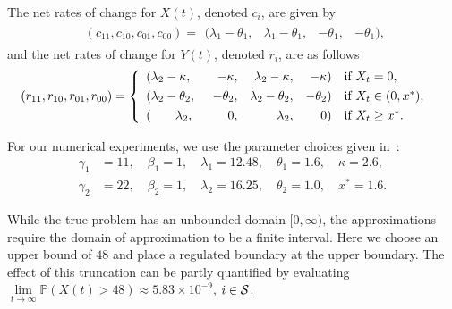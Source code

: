 \begin{model}
	The net rates of change for $X(t)$, denoted $c_i$, are given by 
	\begin{align*} 
	& (c_{11},c_{10},c_{01},c_{00})   =  \begin{array}{rrrr} 
	(\lambda_1-\theta_1,  & \lambda_1 -\theta_1, &  -\theta_1, & -\theta_1),
	\end{array}  
	\end{align*} 
	and the net rates of change for $Y(t)$, denoted $r_i$, are as follows  
	\begin{align*} 
	(r_{11},r_{10},r_{01},r_{00})  & = \left\{ \begin{array}{lrrrll}  
												(\lambda_2 - \kappa, & \;\;\;-\kappa,  & \lambda_2 - \kappa, & -\kappa) &\text{if } X_t = 0, \\
												\vspace*{-0.3cm} \\
		(\lambda_2 - \theta_2, & -\theta_2, & \lambda_2 - \theta_2, & -\theta_2) & \text{if } X_t \in (0,x^*),\\
												\vspace*{-0.3cm} \\
		(\;\;\;\;\;\;\; \lambda_2, & \;\;\;\;0, & \lambda_2, &  \;\;\;\;0) & \text{if } X_t \geq x^*. \end{array}
												\right.
	\end{align*} 

	For our numerical experiments, we use the parameter choices given in~\citep{lnp13}: 
		\begin{align} 
			\label{eqn:parameters}
		\gamma_1 & =11, \quad  \beta_1 = 1, \quad \lambda_1 = 12.48, \quad  \theta_1 = 1.6, \quad  \kappa = 2.6, \\
			\label{eqn:parameters-2}
		\gamma_2 & = 22, \quad \beta_2  = 1, \quad  \lambda_2 = 16.25, \quad \theta_2 = 1.0, \quad x^* = 1.6.
		\end{align} 
\end{model}
	
While the true problem has an unbounded domain $[0,\infty)$, the approximations require the domain of approximation to be a finite interval. Here we choose an upper bound of \(48\) and place a regulated boundary at the upper boundary. The effect of this truncation can be partly quantified by evaluating \(\lim\limits_{t\to\infty}\mathbb P\left(X(t) > 48\right)\approx 5.83 \times 10^{-9}\), \(i\in\mathcal{S}\). 

